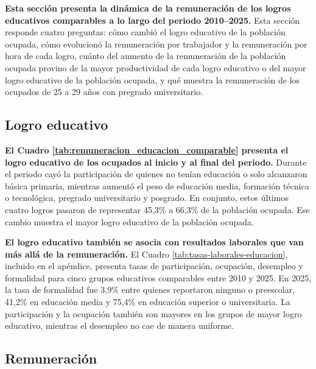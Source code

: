 \textbf{Esta sección presenta la dinámica de la remuneración de los logros educativos comparables a lo largo del periodo 2010--2025.} Esta sección responde cuatro preguntas: cómo cambió el logro educativo de la población ocupada, cómo evolucionó la remuneración por trabajador y la remuneración por hora de cada logro, cuánto del aumento de la remuneración de la población ocupada provino de la mayor productividad de cada logro educativo o del mayor logro educativo de la población ocupada, y qué muestra la remuneración de los ocupados de 25 a 29 años con pregrado universitario.

\subsection{Logro educativo}

\textbf{El Cuadro \ref{tab:remuneracion_educacion_comparable} presenta el logro educativo de los ocupados al inicio y al final del periodo.} %
Durante el periodo cayó la participación de quienes no tenían educación o solo alcanzaron básica primaria, mientras aumentó el peso de educación media, formación técnica o tecnológica, pregrado universitario y posgrado. En conjunto, estos últimos cuatro logros pasaron de representar 45,3\% a 66,3\% de la población ocupada. Ese cambio muestra el mayor logro educativo de la población ocupada.



\textbf{El logro educativo también se asocia con resultados laborales que van más allá de la remuneración.} El Cuadro \ref{tab:tasas-laborales-educacion}, incluido en el apéndice, presenta tasas de participación, ocupación, desempleo y formalidad para cinco grupos educativos comparables entre 2010 y 2025. En 2025, la tasa de formalidad fue 3,9\% entre quienes reportaron ninguno o preescolar, 41,2\% en educación media y 75,4\% en educación superior o universitaria. La participación y la ocupación también son mayores en los grupos de mayor logro educativo, mientras el desempleo no cae de manera uniforme.

\subsection{Remuneración}

